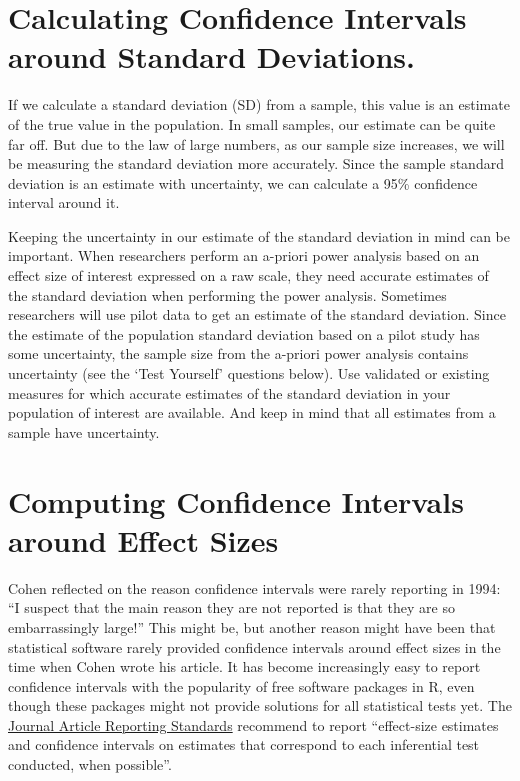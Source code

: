 \documentclass[
  oneside]{book}
\begin{document}
\hypertarget{calculating-confidence-intervals-around-standard-deviations.}{%
\section{Calculating Confidence Intervals around Standard Deviations.}\label{calculating-confidence-intervals-around-standard-deviations.}}

If we calculate a standard deviation (SD) from a sample, this value is an
estimate of the true value in the population. In small samples, our estimate can be quite far off. But due to the law of large numbers, as our sample size increases, we will be measuring the standard deviation more accurately. Since the sample standard deviation is an estimate with uncertainty, we can calculate a 95\% confidence interval around it.

Keeping the uncertainty in our estimate of the standard deviation in mind can be important. When researchers perform an a-priori power analysis based on an effect size of interest expressed on a raw scale, they need accurate estimates of the standard deviation when performing the power analysis. Sometimes researchers will use pilot data to get an estimate of the standard deviation. Since the estimate of the population standard deviation based on a pilot study has some uncertainty, the sample size from the a-priori power analysis contains uncertainty (see the `Test Yourself' questions below). Use validated or existing measures for which accurate estimates of the standard deviation in your population of interest are available. And keep in mind that all estimates from a sample have uncertainty.

\hypertarget{computing-confidence-intervals-around-effect-sizes}{%
\section{Computing Confidence Intervals around Effect Sizes}\label{computing-confidence-intervals-around-effect-sizes}}

Cohen \citeyearpar{cohen_earth_1994} reflected on the reason confidence intervals were rarely reporting in 1994: ``I suspect that the main reason they are not reported is that they are so embarrassingly large!'' This might be, but another reason might have been that statistical software rarely provided confidence intervals around effect sizes in the time when Cohen wrote his article. It has become increasingly easy to report confidence intervals with the popularity of free software packages in R, even though these packages might not provide solutions for all statistical tests yet. The \href{https://apastyle.apa.org/jars/quantitative}{Journal Article Reporting Standards} recommend to report ``effect-size estimates and confidence intervals on estimates that correspond to each inferential test conducted, when possible''.
\end{document}
